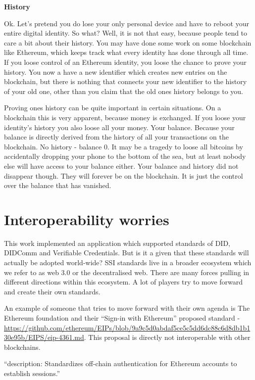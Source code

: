 \textbf{History}

Ok. Let's pretend you do lose your only personal device and have to
reboot your entire digital identity. So what? Well, it is not that easy,
because people tend to care a bit about their history. You may have done
some work on some blockchain like Ethereum, which keeps track what every
identity has done through all time. If you loose control of an Ethereum
identity, you loose the chance to prove your history. You now a have a
new identifier which creates new entries on the blockchain, but there is
nothing that connects your new identifier to the history of your old
one, other than you claim that the old ones history belongs to you.

Proving ones history can be quite important in certain situations. On a
blockchain this is very apparent, because money is exchanged. If you
loose your identity's history you also loose all your money. Your
balance. Because your balance is directly derived from the history of
all your transactions on the blockchain. No history - balance 0. It may
be a tragedy to loose all bitcoins by accidentally dropping your phone
to the bottom of the sea, but at least nobody else will have access to
your balance either. Your balance and history did not disappear though.
They will forever be on the blockchain. It is just the control over the
balance that has vanished.

\hypertarget{interoperability-worries}{%
\section{Interoperability worries}\label{interoperability-worries}}

This work implemented an application which supported standards of DID,
DIDComm and Verifiable Credentials. But is it a given that these
standards will actually be adopted world-wide? SSI standards live in a
broader ecosystem which we refer to as web 3.0 or the decentralised web.
There are many forces pulling in different directions within this
ecosystem. A lot of players try to move forward and create their own
standards.

An example of someone that tries to move forward with their own agenda
is The Ethereum foundation and their ``Sign-in with Ethereum'' proposed
standard -
\url{https://github.com/ethereum/EIPs/blob/9a9c5d0abdaf5ce5c5dd6dc88c6d8db1b130e95b/EIPS/eip-4361.md}.
This proposal is directly not interoperable with other blockchains.

``description: Standardizes off-chain authentication for Ethereum
accounts to establish sessions.''

